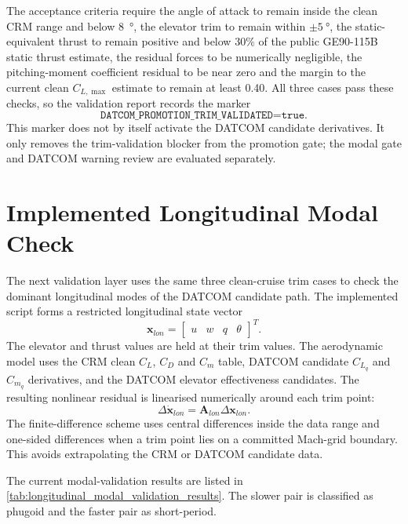 The acceptance criteria require the angle of attack to remain inside the clean CRM range and below \SI{8}{\degree}, the elevator trim to remain within $\pm\SI{5}{\degree}$, the static-equivalent thrust to remain positive and below 30\% of the public GE90-115B static thrust estimate, the residual forces to be numerically negligible, the pitching-moment coefficient residual to be near zero and the margin to the current clean $C_{L,\max}$ estimate to remain at least 0.40. All three cases pass these checks, so the validation report records the marker
\begin{equation}
    \texttt{DATCOM\_PROMOTION\_TRIM\_VALIDATED=true}.
\end{equation}
This marker does not by itself activate the DATCOM candidate derivatives. It only removes the trim-validation blocker from the promotion gate; the modal gate and DATCOM warning review are evaluated separately.

\section{Implemented Longitudinal Modal Check}

The next validation layer uses the same three clean-cruise trim cases to check the dominant longitudinal modes of the DATCOM candidate path. The implemented script  forms a restricted longitudinal state vector
\begin{equation}
    \bm{x}_{lon} =
    \begin{bmatrix}
        u & w & q & \theta
    \end{bmatrix}^{T}.
\end{equation}
The elevator and thrust values are held at their trim values. The aerodynamic model uses the CRM clean $C_L$, $C_D$ and $C_m$ table, DATCOM candidate $C_{L_q}$ and $C_{m_q}$ derivatives, and the DATCOM elevator effectiveness candidates. The resulting nonlinear residual is linearised numerically around each trim point:
\begin{equation}
    \Delta\dot{\bm{x}}_{lon} =
    \bm{A}_{lon}\Delta\bm{x}_{lon}.
\end{equation}
The finite-difference scheme uses central differences inside the data range and one-sided differences when a trim point lies on a committed Mach-grid boundary. This avoids extrapolating the CRM or DATCOM candidate data.

The current modal-validation results are listed in \cref{tab:longitudinal_modal_validation_results}. The slower pair is classified as phugoid and the faster pair as short-period.

